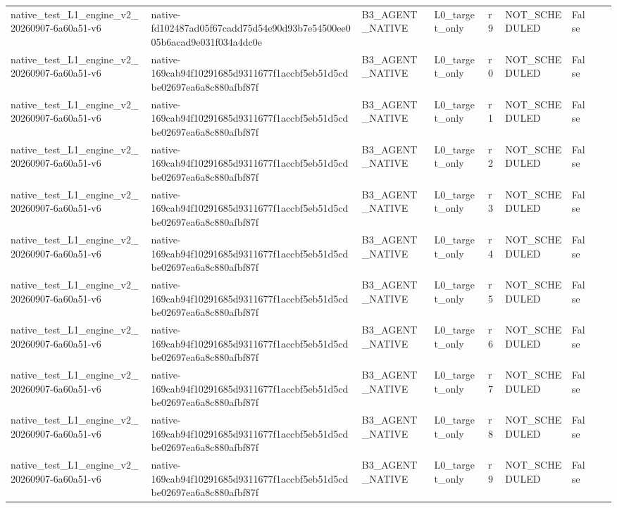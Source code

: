 \begin{tabular}{lllllllll}
native\_test\_L1\_engine\_v2\_20260907-6a60a51-v6 & native-fd102487ad05f67cadd75d54e90d93b7e54500ee005b6acad9e031f034a4dc0e & B3\_AGENT\_NATIVE & L0\_target\_only & r9 & NOT\_SCHEDULED & False &  &  \\
native\_test\_L1\_engine\_v2\_20260907-6a60a51-v6 & native-169cab94f10291685d9311677f1accbf5eb51d5cdbe02697ea6a8c880afbf87f & B3\_AGENT\_NATIVE & L0\_target\_only & r0 & NOT\_SCHEDULED & False &  &  \\
native\_test\_L1\_engine\_v2\_20260907-6a60a51-v6 & native-169cab94f10291685d9311677f1accbf5eb51d5cdbe02697ea6a8c880afbf87f & B3\_AGENT\_NATIVE & L0\_target\_only & r1 & NOT\_SCHEDULED & False &  &  \\
native\_test\_L1\_engine\_v2\_20260907-6a60a51-v6 & native-169cab94f10291685d9311677f1accbf5eb51d5cdbe02697ea6a8c880afbf87f & B3\_AGENT\_NATIVE & L0\_target\_only & r2 & NOT\_SCHEDULED & False &  &  \\
native\_test\_L1\_engine\_v2\_20260907-6a60a51-v6 & native-169cab94f10291685d9311677f1accbf5eb51d5cdbe02697ea6a8c880afbf87f & B3\_AGENT\_NATIVE & L0\_target\_only & r3 & NOT\_SCHEDULED & False &  &  \\
native\_test\_L1\_engine\_v2\_20260907-6a60a51-v6 & native-169cab94f10291685d9311677f1accbf5eb51d5cdbe02697ea6a8c880afbf87f & B3\_AGENT\_NATIVE & L0\_target\_only & r4 & NOT\_SCHEDULED & False &  &  \\
native\_test\_L1\_engine\_v2\_20260907-6a60a51-v6 & native-169cab94f10291685d9311677f1accbf5eb51d5cdbe02697ea6a8c880afbf87f & B3\_AGENT\_NATIVE & L0\_target\_only & r5 & NOT\_SCHEDULED & False &  &  \\
native\_test\_L1\_engine\_v2\_20260907-6a60a51-v6 & native-169cab94f10291685d9311677f1accbf5eb51d5cdbe02697ea6a8c880afbf87f & B3\_AGENT\_NATIVE & L0\_target\_only & r6 & NOT\_SCHEDULED & False &  &  \\
native\_test\_L1\_engine\_v2\_20260907-6a60a51-v6 & native-169cab94f10291685d9311677f1accbf5eb51d5cdbe02697ea6a8c880afbf87f & B3\_AGENT\_NATIVE & L0\_target\_only & r7 & NOT\_SCHEDULED & False &  &  \\
native\_test\_L1\_engine\_v2\_20260907-6a60a51-v6 & native-169cab94f10291685d9311677f1accbf5eb51d5cdbe02697ea6a8c880afbf87f & B3\_AGENT\_NATIVE & L0\_target\_only & r8 & NOT\_SCHEDULED & False &  &  \\
native\_test\_L1\_engine\_v2\_20260907-6a60a51-v6 & native-169cab94f10291685d9311677f1accbf5eb51d5cdbe02697ea6a8c880afbf87f & B3\_AGENT\_NATIVE & L0\_target\_only & r9 & NOT\_SCHEDULED & False &  &  \\

\end{tabular}

